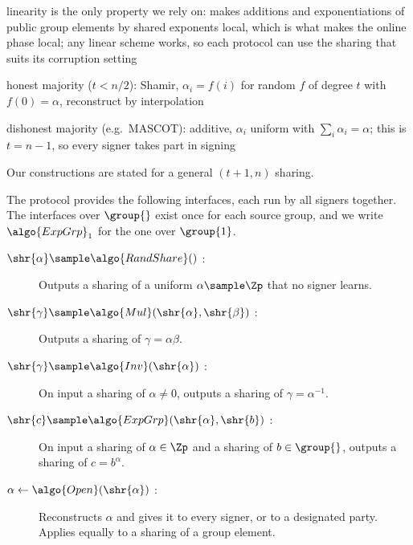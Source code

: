 \begin{outline}
  \item linearity is the only property we rely on: makes additions and
exponentiations of public group elements by shared exponents local, which is what
makes the online phase local; any linear scheme works, so each protocol can use
the sharing that suits its corruption setting
  \item honest majority ($t < n/2$): Shamir, $\alpha_i = f(i)$ for random $f$ of
degree $t$ with $f(0) = \alpha$, reconstruct by interpolation
  \item dishonest majority (e.g.\ MASCOT): additive, $\alpha_i$ uniform with
$\sum_i \alpha_i = \alpha$; this is $t = n-1$, so every signer takes part in
signing
\end{outline}

Our constructions are stated for a general $(t+1, n)$ sharing.

The protocol provides the following interfaces, each run by all signers
together. The interfaces over $\group{}$ exist once for each source group, and
we write $\algo{ExpGrp}_1$ for the one over $\group{1}$.

  \begin{description}

    \item[$\shr{\alpha} \sample \algo{RandShare}()$ :] Outputs a sharing of a
uniform $\alpha \sample \Zp$ that no signer learns.

    \item[$\shr{\gamma} \sample \algo{Mul}(\shr{\alpha}, \shr{\beta})$ :] Outputs
a sharing of $\gamma = \alpha\beta$.

    \item[$\shr{\gamma} \sample \algo{Inv}(\shr{\alpha})$ :] On input a sharing
of $\alpha \neq 0$, outputs a sharing of $\gamma = \alpha^{-1}$.

    \item[$\shr{c} \sample \algo{ExpGrp}(\shr{\alpha}, \shr{b})$ :] On input a
sharing of $\alpha \in \Zp$ and a sharing of $b \in \group{}$, outputs a sharing
of $c = b^\alpha$.

    \item[$\alpha \leftarrow \algo{Open}(\shr{\alpha})$ :] Reconstructs $\alpha$
and gives it to every signer, or to a designated party. Applies equally to a
sharing of a group element.

  \end{description}


